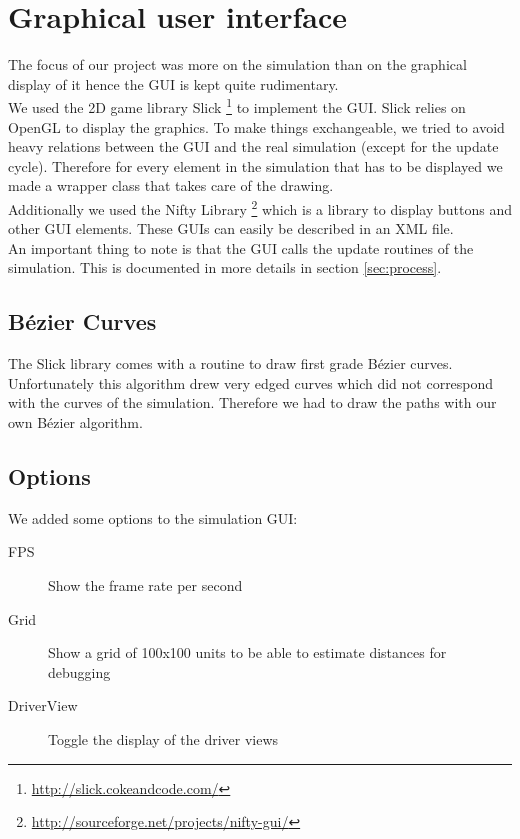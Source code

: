 
\section{Graphical user interface}
\label{sec:gui}

The focus of our project was more on the simulation than on the graphical 
display of it hence the GUI is kept quite rudimentary. \\

\noindent We used the 2D game library Slick
\footnote{\href{http://slick.cokeandcode.com/}{http://slick.cokeandcode.com/}}
to implement the GUI. Slick relies on OpenGL to display the graphics.
To make things exchangeable, we tried to avoid heavy relations between
the GUI and the real simulation (except for the update cycle).  Therefore
for every element in the simulation that has to be displayed we made a
wrapper class that takes care of the drawing. \\

\noindent Additionally we used the Nifty Library
\footnote{\href{http://sourceforge.net/projects/nifty-gui/}
{http://sourceforge.net/projects/nifty-gui/}} which is a library to
display buttons and other GUI elements. These GUIs can easily be described
in an XML file. \\

\noindent An important thing to note is that the GUI calls the update routines of the
simulation. This is documented in more details in section \ref{sec:process}.

\subsection{Bézier Curves}

The Slick library comes with a routine to draw first grade Bézier curves.
Unfortunately this algorithm drew very edged curves which did not correspond
with the curves of the simulation. Therefore we had to draw the paths with
our own Bézier algorithm.

\subsection{Options}

We added some options to the simulation GUI:

\begin{description}

\item[FPS] Show the frame rate per second
\item[Grid] Show a grid of 100x100 units to be able to estimate distances for debugging
\item[DriverView] Toggle the display of the driver views

\end{description}
